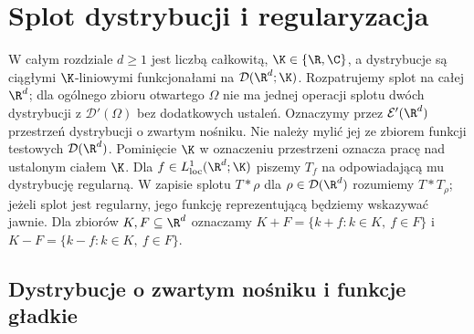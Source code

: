 \setcounter{section}{4}
\section{Splot dystrybucji i regularyzacja}
\label{sec:splot21}

\providecommand{\atlasref}[2]{#2}


W całym rozdziale $d\ge1$ jest liczbą całkowitą,
$\K\in\{\R,\C\}$, a dystrybucje
są ciągłymi $\K$-liniowymi funkcjonałami na
$\mathcal D(\R^d;\K)$. Rozpatrujemy splot na całej
$\R^d$; dla ogólnego zbioru otwartego $\Omega$ nie ma
jednej operacji splotu dwóch dystrybucji z
$\mathcal D'(\Omega)$ bez dodatkowych ustaleń.
Oznaczymy przez $\mathcal E'(\R^d)$ przestrzeń dystrybucji
o zwartym nośniku. Nie należy mylić jej ze zbiorem funkcji
testowych $\mathcal D(\R^d)$. Pominięcie $\K$ w oznaczeniu
przestrzeni oznacza pracę nad ustalonym ciałem $\K$.
Dla $f\in L^1_{\mathrm{loc}}(\R^d;\K)$ piszemy $T_f$ na
odpowiadającą mu dystrybucję regularną. W zapisie splotu
$T*\rho$ dla $\rho\in\mathcal D(\R^d)$ rozumiemy
$T*T_\rho$; jeżeli splot jest regularny, jego funkcję
reprezentującą będziemy wskazywać jawnie.
Dla zbiorów $K,F\subseteq\R^d$ oznaczamy
$K+F=\{k+f:k\in K,\ f\in F\}$ i
$K-F=\{k-f:k\in K,\ f\in F\}$.

\subsection{Dystrybucje o zwartym nośniku i funkcje gładkie}

